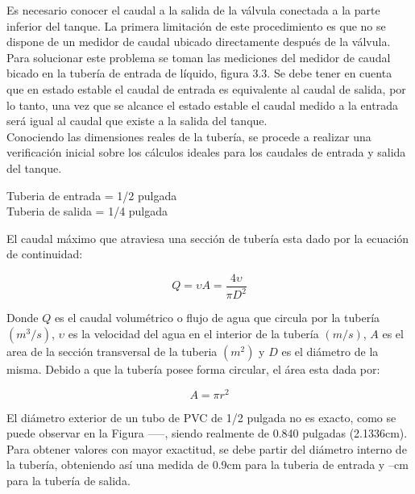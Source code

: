 \documentclass[a4paper,12pt,twoside]{proyectotanquesecci}
\begin{document}
Es necesario conocer el caudal a la salida de la válvula conectada a la parte inferior del tanque. La primera limitación de este procedimiento es
que no se dispone de un medidor de caudal ubicado directamente después de la válvula. Para solucionar este problema se toman las mediciones del medidor de caudal bicado en la tubería de entrada de líquido, figura 3.3. Se debe tener en cuenta que en estado estable el caudal de entrada es equivalente al caudal de salida, por lo tanto, una vez que se alcance el estado estable el caudal medido a la entrada será igual al caudal que
existe a la salida del tanque. \\

Conociendo las dimensiones reales de la tubería, se procede a realizar una verificación inicial sobre los cálculos ideales para los caudales de entrada y salida del tanque.

\begin{center}
Tuberia de entrada = 1/2 pulgada \\
Tuberia de salida = 1/4 pulgada
\end{center}

El caudal máximo que atraviesa una sección de tubería esta dado por la ecuación de continuidad:

\begin{equation}
Q=\upsilon A=\frac{4\upsilon}{\pi D^{2}}
\end{equation}

Donde $Q$ es el caudal volumétrico o flujo de agua que circula por la tubería $(m^{3}/s)$, $\upsilon$ es la velocidad del agua en el interior de la tubería $(m/s)$, $A$ es el area de la sección transversal de la tuberia $(m^{2})$ y $D$ es el diámetro de la misma. Debido a que la tubería posee forma circular, el área esta dada por:

\begin{equation}
A=\pi r^{2}
\end{equation}

El diámetro exterior de un tubo de PVC de 1/2 pulgada no es exacto, como se puede observar en la Figura -----, siendo realmente de 0.840 pulgadas (2.1336cm). Para obtener valores con mayor exactitud, se debe partir del diámetro interno de la tubería, obteniendo así una medida de 0.9cm para la tuberia de entrada y --cm para la tubería de salida.
\end{document}
